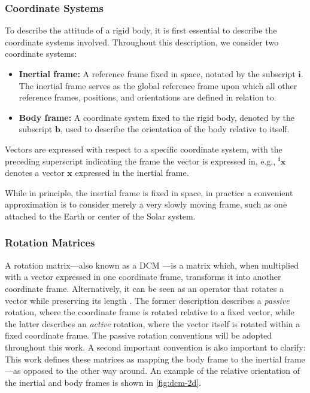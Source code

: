 \subsubsection{Coordinate Systems}
\label{par:coordinate-systems}
To describe the attitude of a rigid body, it is first essential to describe the coordinate systems involved. Throughout this description, we consider two coordinate systems:
\begin{itemize}
	\item[$\bullet$] \textbf{Inertial frame:} A reference frame fixed in space, notated by the subscript $\mathbf{i}$. 
                                                The inertial frame serves as the global reference frame upon which all other reference frames, positions, and orientations are defined in relation to.
	\item[$\bullet$] \textbf{Body frame:} A coordinate system fixed to the rigid body, denoted by the subscript $\mathbf{b}$, used to describe the orientation of the body relative to itself.
\end{itemize}

Vectors are expressed with respect to a specific coordinate system, with the preceding superscript indicating the frame the vector is expressed in, e.g., ${}^{\mathbf{i}}\mathbf{x}$ denotes a vector $\mathbf{x}$ expressed in the inertial frame.

While in principle, the inertial frame is fixed in space, in practice a convenient approximation is to consider merely a very slowly moving frame, such as one attached to the Earth or center of the Solar system.

\subsubsection{Rotation Matrices}
\label{par:rotation-matrices}
A rotation matrix---also known as a \ac{DCM} \cite{Schuster93}---is a matrix which, when multiplied with a vector expressed in one coordinate frame, transforms it into another coordinate frame. 
Alternatively, it can be seen as an operator that rotates a vector while preserving its length \cite{Diebel06}.
The former description describes a \emph{passive} rotation, where the coordinate frame is rotated relative to a fixed vector, while the latter describes an \emph{active} rotation, where the vector itself is rotated within a fixed coordinate frame.
The passive rotation conventions will be adopted throughout this work.
A second important convention is also important to clarify: This work defines these matrices as mapping the body frame to the inertial frame---as opposed to the other way around.
An example of the relative orientation of the inertial and body frames is shown in \cref{fig:dcm-2d}.

